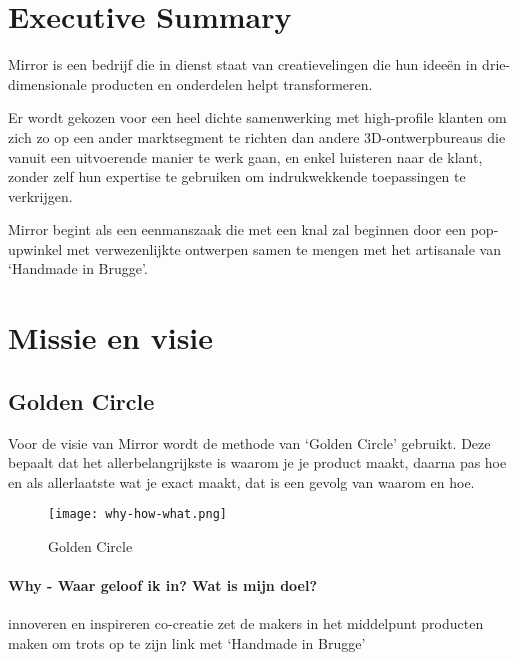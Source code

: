 
\section*{Executive Summary} %
\label{sec:executive_summary}

Mirror is een bedrijf die in dienst staat van creatievelingen die hun ideeën in drie-dimensionale producten en onderdelen helpt transformeren.

Er wordt gekozen voor een heel dichte samenwerking met high-profile klanten om zich zo op een ander marktsegment te richten dan andere 3D-ontwerpbureaus die vanuit een uitvoerende manier te werk gaan, en enkel luisteren naar de klant, zonder zelf hun expertise te gebruiken om indrukwekkende toepassingen te verkrijgen.

Mirror begint als een eenmanszaak die met een knal zal beginnen door een pop-upwinkel met verwezenlijkte ontwerpen samen te mengen met het artisanale van `Handmade in Brugge'.


\section{Missie en visie} %
\label{sec:missie_en_visie}
\subsection{Golden Circle} %
\label{ssub:golden_circle}

Voor de visie van Mirror wordt de methode van `Golden Circle'\cite{start-with-why} gebruikt. Deze bepaalt dat het allerbelangrijkste is waarom je je product maakt, daarna pas hoe en als allerlaatste wat je exact maakt, dat is een gevolg van waarom en hoe.

\begin{figure}[H]
  \label{figure:golden-circle}
  \centering
  \texttt{[image: why-how-what.png]}
  \caption{Golden Circle\cite{golden-circle}}
\end{figure}

\paragraph{\textbf{Why} - Waar geloof ik in? Wat is mijn doel?}

innoveren en inspireren
co-creatie
zet de makers in het middelpunt
producten maken om trots op te zijn
link met `Handmade in Brugge'

